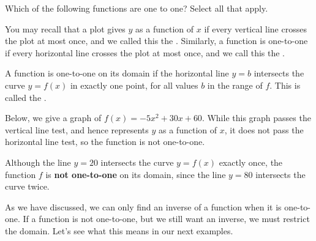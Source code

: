 \documentclass{ximera}
\begin{document}
\begin{question}
Which of the following functions are one to one?  Select all that
apply.
\begin{selectAll}
\end{selectAll}
\end{question}




You may recall that a plot gives $y$ as a function of $x$ if every
vertical line crosses the plot at most once, and we called this
the . Similarly, a function is one-to-one
if every horizontal line crosses the plot at most once, and we call this 
the .

\begin{theorem}
  A function is one-to-one on its domain if the horizontal line $y = b$
  intersects the curve $y=f(x)$ in exactly one point, for all values $b$ in the range of $f$. This is called
  the .
\end{theorem}
Below, we give a graph of $f(x)=-5x^2+30x+60$. While this graph passes
the vertical line test, and hence represents $y$ as a function of $x$,
it does not pass the horizontal line test, so the function is not
one-to-one.
\begin{image}
\end{image}
Although the line $y=20$ intersects the curve $y=f(x)$ exactly once, the function $f$ is \textbf{not one-to-one} on its domain, since the line $y=80$ intersects the curve twice.


As we have discussed, we can only find an inverse of a function when
it is one-to-one.  If a function is not one-to-one, but we still want
an inverse, we must restrict the domain. Let's see what this means in
our next examples.
\end{document}
